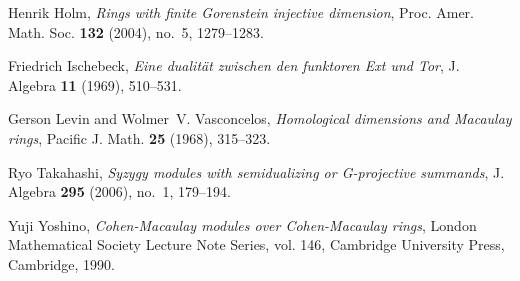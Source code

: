 \documentclass{amsart}
\theoremstyle{plain} %
\theoremstyle{definition}
\begin{document}
\begin{thebibliography}{10}
Henrik Holm, \emph{Rings with finite {G}orenstein injective dimension}, Proc.
  Amer. Math. Soc. \textbf{132} (2004), no.~5, 1279--1283.

Friedrich Ischebeck, \emph{Eine dualit{\"a}t zwischen den funktoren {E}xt und
  {T}or}, J. Algebra \textbf{11} (1969), 510--531.

Gerson Levin and Wolmer~V. Vasconcelos, \emph{Homological dimensions and
  {M}acaulay rings}, Pacific J. Math. \textbf{25} (1968), 315--323.

Ryo Takahashi, \emph{Syzygy modules with semidualizing or {G}-projective
  summands}, J. Algebra \textbf{295} (2006), no.~1, 179--194.

Yuji Yoshino, \emph{Cohen-{M}acaulay modules over {C}ohen-{M}acaulay rings},
  London Mathematical Society Lecture Note Series, vol. 146, Cambridge
  University Press, Cambridge, 1990.

\end{thebibliography}
\end{document}
